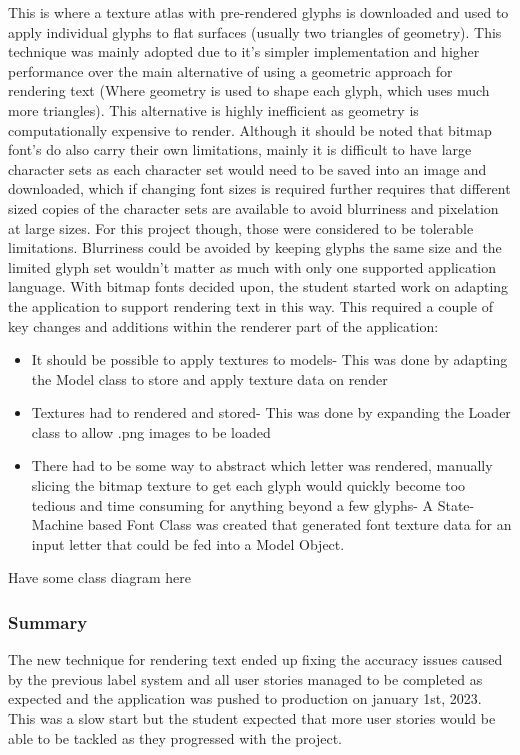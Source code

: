 This is where a texture atlas with pre-rendered glyphs is downloaded and used to apply individual glyphs to flat surfaces (usually two triangles of geometry). This technique was mainly adopted due to it's simpler implementation and higher performance over the main alternative of using a geometric approach for rendering text (Where geometry is used to shape each glyph, which uses much more triangles). This alternative is highly inefficient as geometry is computationally expensive to render. Although it should be noted that bitmap font's do also carry their own limitations, mainly it is difficult to have large character sets as each character set would need to be saved into an image and downloaded, which if changing font sizes is required further requires that different sized copies of the character sets are available to avoid blurriness and pixelation at large sizes.
For this project though, those were considered to be tolerable limitations. Blurriness could be avoided by keeping glyphs the same size and the limited glyph set wouldn't matter as much with only one supported application language.
With bitmap fonts decided upon, the student started work on adapting the application to support rendering text in this way. This required a couple of key changes and additions within the renderer part of the application:
\begin{itemize}
    \item It should be possible to apply textures to models- This was done by adapting the Model class to store and apply texture data on render
    \item Textures had to rendered and stored- This was done by expanding the Loader class to allow .png images to be loaded
    \item There had to be some way to abstract which letter was rendered, manually slicing the bitmap texture to get each glyph would quickly become too tedious and time consuming for anything beyond a few glyphs- A State-Machine based Font Class was created that generated font texture data for an input letter that could be fed into a Model Object.
\end{itemize}

Have some class diagram here

\subsubsection{Summary}
The new technique for rendering text ended up fixing the accuracy issues caused by the previous label system and all user stories managed to be completed as expected and the application was pushed to production on january 1st, 2023. This was a slow start but the student expected that more user stories would be able to be tackled as they progressed with the project.

